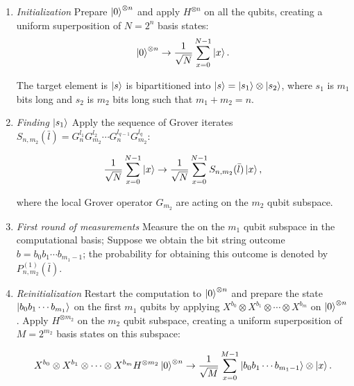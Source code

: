 \begin{enumerate}
\item \emph{Initialization}\newline
Prepare $\ket{0}^{\otimes n}$ and apply $H^{\otimes n}$ on all the qubits, creating a uniform superposition of $N=2^n$ basis states:
\begin{align*}
    \ket{0}^{\otimes n} \to \frac{1}{\sqrt{N}}\displaystyle\sum_{x=0}^{N-1} \ket{x}.
\end{align*}

\noindent
The target element is $\ket{s}$ is bipartitioned into $\ket{s} = \ket{s_1}\otimes\ket{s_2}$, where $s_1$ is $m_1$ bits long and $s_2$ is $m_2$ bits long such that $m_1 + m_2 = n$.

\item \emph{Finding }$\ket{s_1}$\newline
Apply the sequence of Grover iterates $S_{n,m_2}(\bar{l}) = G_n^{l_1} G_{m_2}^{l_2} \cdots G_n^{l_{q-1}}G_{m_2}^{l_q}$:

\begin{align*}
	\frac{1}{\sqrt{N}}\displaystyle\sum_{x=0}^{N-1} \ket{x} \to \frac{1}{\sqrt{N}}\displaystyle\sum_{x=0}^{N-1} S_{n,m_2}(\bar{l})\ket{x},
\end{align*}

\noindent
where the local Grover operator $G_{m_2}$ are acting on the  $m_2$ qubit subspace.

\item \emph{First round of measurements}\newline
    Measure the on the $m_1$ qubit subspace in the computational basis; Suppose we obtain the bit string outcome $b = b_0b_1\cdots b_{m_1-1}$; the probability for obtaining this outcome is denoted by $P_{n, m_2}^{(1)}(\bar{l})$.


\item \emph{Reinitialization}\newline
Restart the computation to $\ket{0}^{\otimes n}$ and prepare the state $\ket{b_0b_1\cdots b_{m_1}}$ on the first $m_1$ qubits by applying $X^{b_0}\otimes X^{b_1}\otimes\cdots\otimes X^{b_m}$ on $\ket{0}^{\otimes n}$.  Apply $H^{\otimes m_2}$ on the $m_2$ qubit subspace, creating a uniform superposition of $M=2^{m_2}$ basis states on this subspace:

\begin{align*}
    X^{b_0}\otimes X^{b_1}\otimes\cdots\otimes X^{b_m} H^{\otimes m_2} \ket{0}^{\otimes n} \to \frac{1}{\sqrt{M}}\displaystyle\sum_{x=0}^{M-1} \ket{b_0b_1\cdots b_{m_1-1}}\otimes\ket{x}.
\end{align*}


\end{enumerate}
